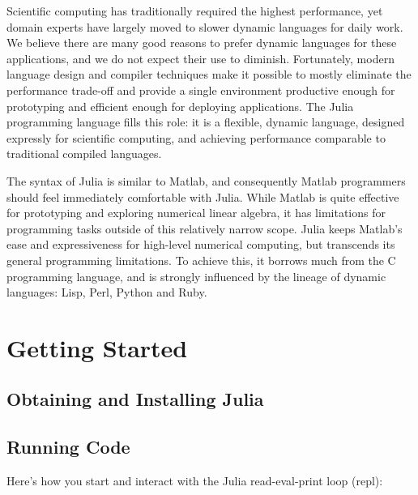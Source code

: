 \documentclass{article}
\title{\thetitle}
\author{
Jeff Bezanson \vspace{0.5em}\\
Stefan Karpinski \vspace{0.5em}\\
Viral Shah \vspace{0.5em}
}
\renewcommand{\sec}[1]{\label{sec:#1}}
\begin{document}
\maketitle

Scientific computing has traditionally required the highest performance, yet domain experts have largely moved to slower dynamic languages for daily work.
We believe there are many good reasons to prefer dynamic languages for these applications, and we do not expect their use to diminish.
Fortunately, modern language design and compiler techniques make it possible to mostly eliminate the performance trade-off and provide a single environment productive enough for prototyping and efficient enough for deploying applications.
The Julia programming language fills this role:
it is a flexible, dynamic language, designed expressly for scientific computing, and achieving performance comparable to traditional compiled languages.

The syntax of Julia is similar to Matlab, and consequently Matlab programmers should feel immediately comfortable with Julia.
While Matlab is quite effective for prototyping and exploring numerical linear algebra, it has limitations for programming tasks outside of this relatively narrow scope.
Julia keeps Matlab's ease and expressiveness for high-level numerical computing, but transcends its general programming limitations.
To achieve this, it borrows much from the C programming language, and is strongly influenced by the lineage of dynamic languages:
Lisp, Perl, Python and Ruby.

\section{Getting Started}\sec{getting-started}

\subsection{Obtaining and Installing Julia}\sec{obtaining-and-installing}

\subsection{Running Code}\sec{running-code}

Here's how you start and interact with the Julia read-eval-print loop (repl):
\end{document}
